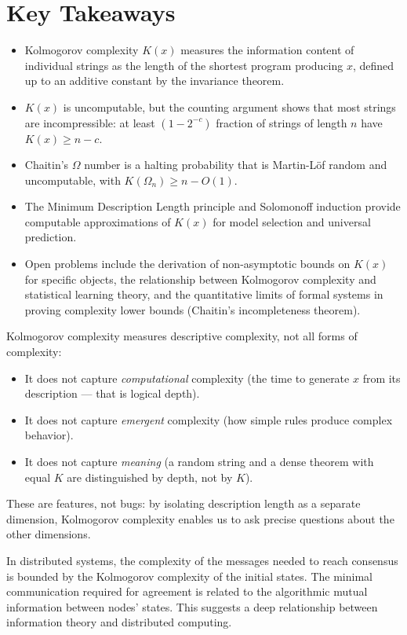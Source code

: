 \section*{Key Takeaways}
\begin{itemize}
\item Kolmogorov complexity $K(x)$ measures the information content of individual strings as the length of the shortest program producing $x$, defined up to an additive constant by the invariance theorem.
\item $K(x)$ is uncomputable, but the counting argument shows that most strings are incompressible: at least $(1 - 2^{-c})$ fraction of strings of length $n$ have $K(x) \geq n - c$.
\item Chaitin's $\Omega$ number is a halting probability that is Martin-Löf random and uncomputable, with $K(\Omega_n) \geq n - O(1)$.
\item The Minimum Description Length principle and Solomonoff induction provide computable approximations of $K(x)$ for model selection and universal prediction.
\item Open problems include the derivation of non-asymptotic bounds on $K(x)$ for specific objects, the relationship between Kolmogorov complexity and statistical learning theory, and the quantitative limits of formal systems in proving complexity lower bounds (Chaitin's incompleteness theorem).
\end{itemize}

Kolmogorov complexity measures descriptive complexity, not all forms of complexity:
\begin{itemize}
\item It does not capture \emph{computational} complexity (the time to generate $x$ from its description --- that is logical depth).
\item It does not capture \emph{emergent} complexity (how simple rules produce complex behavior).
\item It does not capture \emph{meaning} (a random string and a dense theorem with equal $K$ are distinguished by depth, not by $K$).
\end{itemize}
These are features, not bugs: by isolating description length as a separate dimension, Kolmogorov complexity enables us to ask precise questions about the other dimensions.

In distributed systems, the complexity of the messages needed to reach consensus is bounded by the Kolmogorov complexity of the initial states. The minimal communication required for agreement is related to the algorithmic mutual information between nodes' states. This suggests a deep relationship between information theory and distributed computing.

